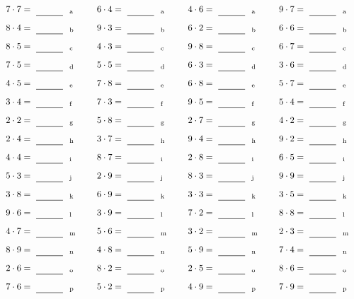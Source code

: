 \documentclass
[
  draft    = true,
  fontsize = 11pt,
  parskip  = half-
]
{scrartcl}
\begin{document}
\par\vfill\par
\begin{align*}
    \pline{7\cdot7}&=\rline{a}
  & \pline{6\cdot4}&=\rline{a}
  & \pline{4\cdot6}&=\rline{a}
  & \pline{9\cdot7}&=\rline{a} \\[1ex]
    \pline{8\cdot4}&=\rline{b}
  & \pline{9\cdot3}&=\rline{b}
  & \pline{6\cdot2}&=\rline{b}
  & \pline{6\cdot6}&=\rline{b} \\[1ex]
    \pline{8\cdot5}&=\rline{c}
  & \pline{4\cdot3}&=\rline{c}
  & \pline{9\cdot8}&=\rline{c}
  & \pline{6\cdot7}&=\rline{c} \\[1ex]
    \pline{7\cdot5}&=\rline{d}
  & \pline{5\cdot5}&=\rline{d}
  & \pline{6\cdot3}&=\rline{d}
  & \pline{3\cdot6}&=\rline{d} \\[1ex]
    \pline{4\cdot5}&=\rline{e}
  & \pline{7\cdot8}&=\rline{e}
  & \pline{6\cdot8}&=\rline{e}
  & \pline{5\cdot7}&=\rline{e} \\[1ex]
    \pline{3\cdot4}&=\rline{f}
  & \pline{7\cdot3}&=\rline{f}
  & \pline{9\cdot5}&=\rline{f}
  & \pline{5\cdot4}&=\rline{f} \\[1ex]
    \pline{2\cdot2}&=\rline{g}
  & \pline{5\cdot8}&=\rline{g}
  & \pline{2\cdot7}&=\rline{g}
  & \pline{4\cdot2}&=\rline{g} \\[1ex]
    \pline{2\cdot4}&=\rline{h}
  & \pline{3\cdot7}&=\rline{h}
  & \pline{9\cdot4}&=\rline{h}
  & \pline{9\cdot2}&=\rline{h} \\[1ex]
    \pline{4\cdot4}&=\rline{i}
  & \pline{8\cdot7}&=\rline{i}
  & \pline{2\cdot8}&=\rline{i}
  & \pline{6\cdot5}&=\rline{i} \\[1ex]
    \pline{5\cdot3}&=\rline{j}
  & \pline{2\cdot9}&=\rline{j}
  & \pline{8\cdot3}&=\rline{j}
  & \pline{9\cdot9}&=\rline{j} \\[1ex]
    \pline{3\cdot8}&=\rline{k}
  & \pline{6\cdot9}&=\rline{k}
  & \pline{3\cdot3}&=\rline{k}
  & \pline{3\cdot5}&=\rline{k} \\[1ex]
    \pline{9\cdot6}&=\rline{l}
  & \pline{3\cdot9}&=\rline{l}
  & \pline{7\cdot2}&=\rline{l}
  & \pline{8\cdot8}&=\rline{l} \\[1ex]
    \pline{4\cdot7}&=\rline{m}
  & \pline{5\cdot6}&=\rline{m}
  & \pline{3\cdot2}&=\rline{m}
  & \pline{2\cdot3}&=\rline{m} \\[1ex]
    \pline{8\cdot9}&=\rline{n}
  & \pline{4\cdot8}&=\rline{n}
  & \pline{5\cdot9}&=\rline{n}
  & \pline{7\cdot4}&=\rline{n} \\[1ex]
    \pline{2\cdot6}&=\rline{o}
  & \pline{8\cdot2}&=\rline{o}
  & \pline{2\cdot5}&=\rline{o}
  & \pline{8\cdot6}&=\rline{o} \\[1ex]
    \pline{7\cdot6}&=\rline{p}
  & \pline{5\cdot2}&=\rline{p}
  & \pline{4\cdot9}&=\rline{p}
  & \pline{7\cdot9}&=\rline{p}
\end{align*}
\end{document}
